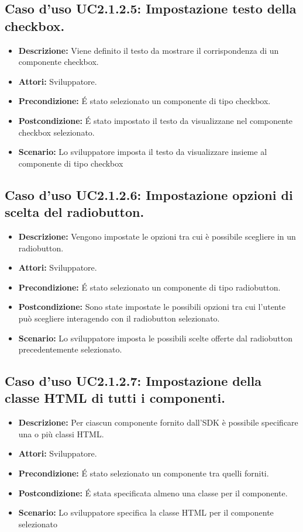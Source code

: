 \subsection{Caso d'uso UC2.1.2.5: Impostazione testo della checkbox.}
\begin{itemize}
\item[]\textbf{Descrizione:} Viene definito il testo da mostrare il corrispondenza di un componente checkbox.
\item[]\textbf{Attori:} Sviluppatore. 
\item[]\textbf{Precondizione:} \'E stato selezionato un componente di tipo checkbox. 
\item[]\textbf{Postcondizione:} \'E stato impostato il testo da visualizzane nel componente checkbox selezionato. 
\item[]\textbf{Scenario:}
 Lo sviluppatore imposta il testo da visualizzare insieme al componente di tipo checkbox 
\end{itemize}

\subsection{Caso d'uso UC2.1.2.6: Impostazione opzioni di scelta del radiobutton.}
\begin{itemize}
\item[]\textbf{Descrizione:} Vengono impostate le opzioni tra cui è possibile scegliere in un radiobutton.
\item[]\textbf{Attori:} Sviluppatore. 
\item[]\textbf{Precondizione:} \'E stato selezionato un componente di tipo radiobutton. 
\item[]\textbf{Postcondizione:} Sono state impostate le possibili opzioni tra cui l'utente può scegliere interagendo con il radiobutton selezionato. 
\item[]\textbf{Scenario:}
Lo sviluppatore imposta le possibili scelte offerte dal radiobutton precedentemente selezionato. 
\end{itemize}

\subsection{Caso d'uso UC2.1.2.7: Impostazione della classe HTML di tutti i componenti.}
\begin{itemize}
\item[]\textbf{Descrizione:} Per ciascun componente fornito dall'SDK è possibile specificare una o più classi HTML.
\item[]\textbf{Attori:} Sviluppatore. 
\item[]\textbf{Precondizione:} \'E stato selezionato un componente tra quelli forniti. 
\item[]\textbf{Postcondizione:} \'E stata specificata almeno una classe per il componente. 
\item[]\textbf{Scenario:}
Lo sviluppatore specifica la classe HTML per il componente selezionato 
\end{itemize}

